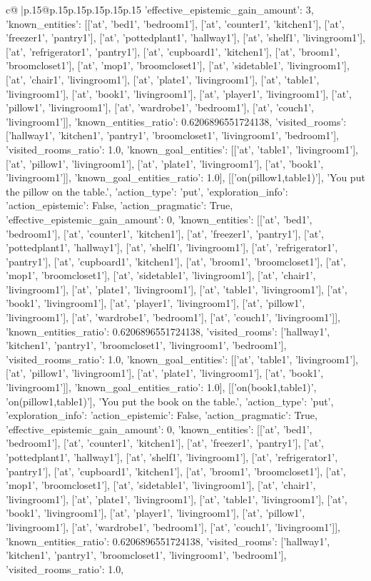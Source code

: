 \documentclass{article}
\begin{document}
{\begin{supertabular}{c@{$\;$}|p{.15\linewidth}@{}p{.15\linewidth}p{.15\linewidth}p{.15\linewidth}p{.15\linewidth}p{.15\linewidth}}
{{{'effective_epistemic_gain_amount': 3, 'known_entities': [['at', 'bed1', 'bedroom1'], ['at', 'counter1', 'kitchen1'], ['at', 'freezer1', 'pantry1'], ['at', 'pottedplant1', 'hallway1'], ['at', 'shelf1', 'livingroom1'], ['at', 'refrigerator1', 'pantry1'], ['at', 'cupboard1', 'kitchen1'], ['at', 'broom1', 'broomcloset1'], ['at', 'mop1', 'broomcloset1'], ['at', 'sidetable1', 'livingroom1'], ['at', 'chair1', 'livingroom1'], ['at', 'plate1', 'livingroom1'], ['at', 'table1', 'livingroom1'], ['at', 'book1', 'livingroom1'], ['at', 'player1', 'livingroom1'], ['at', 'pillow1', 'livingroom1'], ['at', 'wardrobe1', 'bedroom1'], ['at', 'couch1', 'livingroom1']], 'known_entities_ratio': 0.6206896551724138, 'visited_rooms': ['hallway1', 'kitchen1', 'pantry1', 'broomcloset1', 'livingroom1', 'bedroom1'], 'visited_rooms_ratio': 1.0, 'known_goal_entities': [['at', 'table1', 'livingroom1'], ['at', 'pillow1', 'livingroom1'], ['at', 'plate1', 'livingroom1'], ['at', 'book1', 'livingroom1']], 'known_goal_entities_ratio': 1.0}}], [['on(pillow1,table1)'], 'You put the pillow on the table.', {'action_type': 'put', 'exploration_info': {'action_epistemic': False, 'action_pragmatic': True, 'effective_epistemic_gain_amount': 0, 'known_entities': [['at', 'bed1', 'bedroom1'], ['at', 'counter1', 'kitchen1'], ['at', 'freezer1', 'pantry1'], ['at', 'pottedplant1', 'hallway1'], ['at', 'shelf1', 'livingroom1'], ['at', 'refrigerator1', 'pantry1'], ['at', 'cupboard1', 'kitchen1'], ['at', 'broom1', 'broomcloset1'], ['at', 'mop1', 'broomcloset1'], ['at', 'sidetable1', 'livingroom1'], ['at', 'chair1', 'livingroom1'], ['at', 'plate1', 'livingroom1'], ['at', 'table1', 'livingroom1'], ['at', 'book1', 'livingroom1'], ['at', 'player1', 'livingroom1'], ['at', 'pillow1', 'livingroom1'], ['at', 'wardrobe1', 'bedroom1'], ['at', 'couch1', 'livingroom1']], 'known_entities_ratio': 0.6206896551724138, 'visited_rooms': ['hallway1', 'kitchen1', 'pantry1', 'broomcloset1', 'livingroom1', 'bedroom1'], 'visited_rooms_ratio': 1.0, 'known_goal_entities': [['at', 'table1', 'livingroom1'], ['at', 'pillow1', 'livingroom1'], ['at', 'plate1', 'livingroom1'], ['at', 'book1', 'livingroom1']], 'known_goal_entities_ratio': 1.0}}], [['on(book1,table1)', 'on(pillow1,table1)'], 'You put the book on the table.', {'action_type': 'put', 'exploration_info': {'action_epistemic': False, 'action_pragmatic': True, 'effective_epistemic_gain_amount': 0, 'known_entities': [['at', 'bed1', 'bedroom1'], ['at', 'counter1', 'kitchen1'], ['at', 'freezer1', 'pantry1'], ['at', 'pottedplant1', 'hallway1'], ['at', 'shelf1', 'livingroom1'], ['at', 'refrigerator1', 'pantry1'], ['at', 'cupboard1', 'kitchen1'], ['at', 'broom1', 'broomcloset1'], ['at', 'mop1', 'broomcloset1'], ['at', 'sidetable1', 'livingroom1'], ['at', 'chair1', 'livingroom1'], ['at', 'plate1', 'livingroom1'], ['at', 'table1', 'livingroom1'], ['at', 'book1', 'livingroom1'], ['at', 'player1', 'livingroom1'], ['at', 'pillow1', 'livingroom1'], ['at', 'wardrobe1', 'bedroom1'], ['at', 'couch1', 'livingroom1']], 'known_entities_ratio': 0.6206896551724138, 'visited_rooms': ['hallway1', 'kitchen1', 'pantry1', 'broomcloset1', 'livingroom1', 'bedroom1'], 'visited_rooms_ratio': 1.0, }}}
\end{supertabular}}
\end{document}
